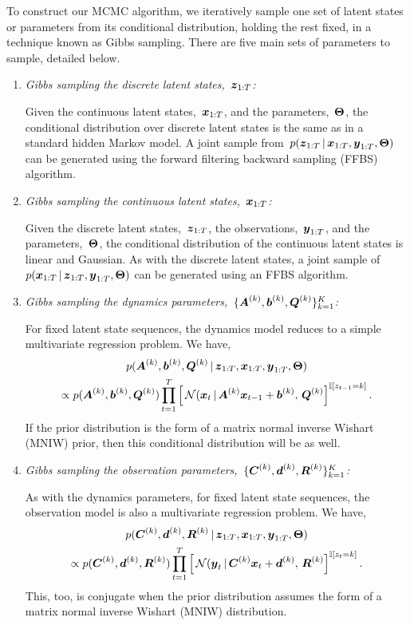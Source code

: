 \documentclass{article}
\begin{document}
To construct our MCMC algorithm, we iteratively sample one set of 
latent states or parameters from its conditional distribution, holding 
the rest fixed, in a technique known as Gibbs sampling. 
There are five main sets of parameters to sample, detailed below.
\begin{enumerate}
  \item \textit{Gibbs sampling the discrete latent states,~$\boldsymbol{z}_{1:T}$:}
    
    Given the continuous latent states,~$\boldsymbol{x}_{1:T}$, and the
    parameters,~$\boldsymbol{\Theta}$, the conditional distribution over discrete
    latent states is the same as in a standard hidden Markov model. A
    joint sample from~$p(\boldsymbol{z}_{1:T} \,|\, \boldsymbol{x}_{1:T}, \boldsymbol{y}_{1:T},
    \boldsymbol{\Theta})$ can be generated using the forward filtering backward
    sampling (FFBS) algorithm.

  \item \textit{Gibbs sampling the continuous latent states,~$\boldsymbol{x}_{1:T}$:}
    
    Given the discrete latent states,~$\boldsymbol{z}_{1:T}$, the observations,~$\boldsymbol{y}_{1:T}$,
    and the parameters,~$\boldsymbol{\Theta}$, the conditional distribution of the 
    continuous latent states is linear and Gaussian. As with the discrete
    latent states, a joint sample of~$p(\boldsymbol{x}_{1:T} \,|\, \boldsymbol{z}_{1:T}, \boldsymbol{y}_{1:T}, \boldsymbol{\Theta})$
    can be generated using an FFBS algorithm.

  \item \textit{Gibbs sampling the dynamics parameters,~$\{\boldsymbol{A}^{(k)}, \boldsymbol{b}^{(k)}, \boldsymbol{Q}^{(k)}\}_{k=1}^K$:}
    
    For fixed latent state sequences, the dynamics model reduces to a simple 
    multivariate regression problem. We have,
    \begin{multline}
      p(\boldsymbol{A}^{(k)}, \boldsymbol{b}^{(k)}, \boldsymbol{Q}^{(k)}  \,|\, \boldsymbol{z}_{1:T}, \boldsymbol{x}_{1:T}, \boldsymbol{y}_{1:T}, \boldsymbol{\Theta})
      \\ 
      \propto
      p(\boldsymbol{A}^{(k)}, \boldsymbol{b}^{(k)}, \boldsymbol{Q}^{(k)})
      \prod_{t=1}^T \left[ \,
        \mathcal{N}(\boldsymbol{x}_{t} \,|\, \boldsymbol{A}^{(k)} \boldsymbol{x}_{t-1} + \boldsymbol{b}^{(k)},\, \boldsymbol{Q}^{(k)} \right]^{\mathbb{I}[z_{t-1}=k]}.
    \end{multline}
    If the prior distribution is the form of a matrix normal inverse Wishart (MNIW) prior, 
    then this conditional distribution will be as well. 

  \item \textit{Gibbs sampling the observation parameters,~$\{\boldsymbol{C}^{(k)}, \boldsymbol{d}^{(k)}, \boldsymbol{R}^{(k)}\}_{k=1}^K$:}
    
    As with the dynamics parameters, 
    for fixed latent state sequences, the observation model is also a 
    multivariate regression problem. We have,
    \begin{multline}
      p(\boldsymbol{C}^{(k)}, \boldsymbol{d}^{(k)}, \boldsymbol{R}^{(k)}  \,|\, \boldsymbol{z}_{1:T}, \boldsymbol{x}_{1:T}, \boldsymbol{y}_{1:T}, \boldsymbol{\Theta})
      \\ 
      \propto
      p(\boldsymbol{C}^{(k)}, \boldsymbol{d}^{(k)}, \boldsymbol{R}^{(k)})
      \prod_{t=1}^T \left[ \,
        \mathcal{N}(\boldsymbol{y}_{t} \,|\, \boldsymbol{C}^{(k)} \boldsymbol{x}_{t} + \boldsymbol{d}^{(k)},\, \boldsymbol{R}^{(k)} \right]^{\mathbb{I}[z_{t}=k]}.
    \end{multline}
    This, too, is conjugate when the prior distribution assumes the
    form of a matrix normal inverse Wishart (MNIW) distribution.


\end{enumerate}
\end{document}
